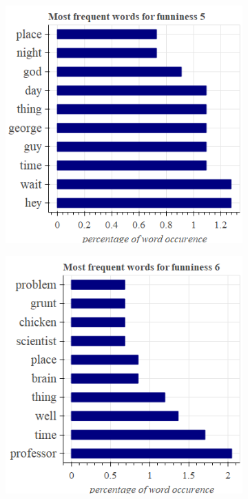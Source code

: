 \documentclass[draft,final,oneside]{vutinfth} %
\begin{document}
\begin{figure}
\centering

\begin{subfigure}[b]{0.45\textwidth}
\centering
\includegraphics[width=1.0\textwidth]{graphics/word_occurence/funniness_5}
\end{subfigure}\quad
\begin{subfigure}[b]{0.45\textwidth}
\centering
\includegraphics[width=1.0\textwidth]{graphics/word_occurence/funniness_6}
\end{subfigure}



\end{figure}
\end{document}
